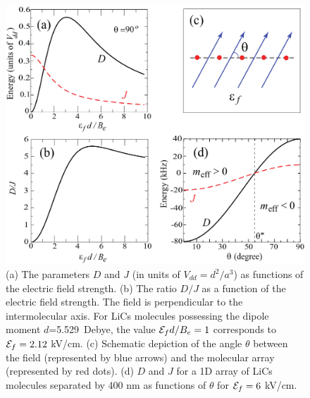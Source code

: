\begin{figure}[htbp] 
\centering
\includegraphics[width=\linewidth]{Figure1FourPanels.pdf}
\caption{ (a) The parameters $D$ and $J$ (in units of $V_{dd} = d^2/a^3$) as functions of the electric field strength.
 (b) The ratio  $D/J$ as a function of the electric field strength. The field is perpendicular to the intermolecular axis.
For LiCs molecules possessing the dipole moment $d$=5.529~Debye, the value ${\cal E}_f d/B_e = 1$ corresponds to
 ${\cal E}_f = 2.12$ kV/cm. (c) Schematic depiction of the angle $\theta$ between the field (represented by blue
 arrows) and the molecular array (represented by red dots). (d) $D$ and $J$ for a 1D array of LiCs molecules separated
 by 400 nm as functions of $\theta$ for ${\cal E}_f = 6$ kV/cm.
} \label{fig:HowDJChanges}
\end{figure}


